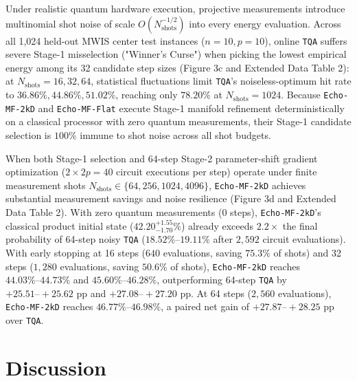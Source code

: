 \documentclass[10pt,a4paper]{article}
\begin{document}
Under realistic quantum hardware execution, projective measurements introduce multinomial shot noise of scale $O(N_{\mathrm{shots}}^{-1/2})$ into every energy evaluation. Across all 1,024 held-out MWIS center test instances ($n=10, p=10$), online \texttt{TQA} suffers severe Stage-1 misselection ("Winner's Curse") when picking the lowest empirical energy among its 32 candidate step sizes (Figure 3c and Extended Data Table 2): at $N_{\mathrm{shots}} = 16, 32, 64$, statistical fluctuations limit \texttt{TQA}'s noiseless-optimum hit rate to $36.86\%, 44.86\%, 51.02\%$, reaching only $78.20\%$ at $N_{\mathrm{shots}} = 1024$. Because \texttt{Echo-MF-2kD} and \texttt{Echo-MF-Flat} execute Stage-1 manifold refinement deterministically on a classical processor with zero quantum measurements, their Stage-1 candidate selection is $100\%$ immune to shot noise across all shot budgets.

When both Stage-1 selection and 64-step Stage-2 parameter-shift gradient optimization ($2 \times 2p = 40$ circuit executions per step) operate under finite measurement shots $N_{\mathrm{shots}} \in \{64, 256, 1024, 4096\}$, \texttt{Echo-MF-2kD} achieves substantial measurement savings and noise resilience (Figure 3d and Extended Data Table 2). With zero quantum measurements (0 steps), \texttt{Echo-MF-2kD}'s classical product initial state ($\mathbf{42.20}^{+1.55}_{-1.70}\%$) already exceeds $2.2\times$ the final probability of 64-step noisy \texttt{TQA} ($18.52\%\mbox{--}19.11\%$ after $2{,}592$ circuit evaluations). With early stopping at 16 steps ($640$ evaluations, saving $75.3\%$ of shots) and 32 steps ($1{,}280$ evaluations, saving $50.6\%$ of shots), \texttt{Echo-MF-2kD} reaches $44.03\%\mbox{--}44.73\%$ and $45.60\%\mbox{--}46.28\%$, outperforming 64-step \texttt{TQA} by $\mathbf{+25.51\mbox{--}{+}25.62}$ pp and $\mathbf{+27.08\mbox{--}{+}27.20}$ pp. At 64 steps ($2{,}560$ evaluations), \texttt{Echo-MF-2kD} reaches $\mathbf{46.77}\%\mbox{--}\mathbf{46.98}\%$, a paired net gain of $\mathbf{+27.87\mbox{--}{+}28.25}$ pp over \texttt{TQA}.


\section*{Discussion}
\end{document}

